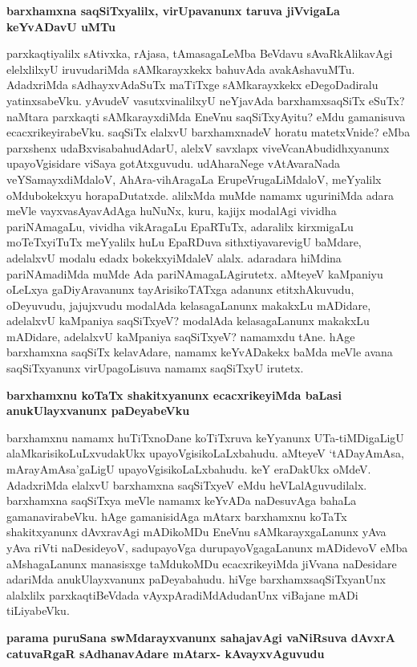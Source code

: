 {\medskip
\noindent
{\large\bf barxhamxna saqSiTxyalilx, virUpavanunx taruva jiVvigaLa keYvADavU uMTu}}\label{page192}
\medskip

\noindent
parxkaqtiyalilx sAtivxka, rAjasa, tAmasagaLeMba BeVdavu sAvaRkAlikavAgi elelx\-lilxyU iruvuda\-riMda sAMkarayxkekx bahuvAda avakAshavuMTu. AdadxriMda sAdhayxvAdaSuTx maTiTxge sAMkarayxkekx eDegoDadiralu yatinxsabeVku. yAvudeV vasutxvinalilxyU neYjavAda barxhamxsaqSiTx eSuTx? naMtara parxkaqti sAMkarayxdiMda EneVnu saqSiTxyAyitu? eMdu gamanisuva ecacxrikeyirabeVku. saqSiTx elalxvU barxhamxnadeV horatu matetxVnide? eMba parxshenx udaBxvisabahudAdarU, alelxV savxlapx viveVcanAbudidhxyanunx upayoVgisidare viSaya gotAtxguvudu. udAharaNege vAtAvaraNada veYSamayxdiMdaloV, AhAra-vihAragaLa Eru\-peVrugaLiMdaloV, meYyalilx oMdubokekxyu horapaDutatxde. alilxMda muMde namamx uguriniMda adara meVle vayxvasAyavAdAga huNuNx, kuru, kajijx modalAgi vividha pariNAmagaLu, vividha vikAragaLu EpaRTuTx, adaralilx kirxmigaLu moTeTxyiTuTx meYyalilx huLu EpaRDuva sithxtiyavarevigU baMdare, ade\-lalxvU modalu edadx bokekxyiMdaleV alalx. adaradara hiMdina pariNAmadiMda muMde Ada pariNAma\-gaLAgirutetx. aMteyeV kaMpaniyu oLeLxya gaDiyAravanunx tayArisikoTATxga adanunx etitxhAkuvudu, oDeyuvudu, jajujxvudu modalAda kelasagaLanunx makakxLu mADidare, adelalxvU kaMpaniya saqSiTxyeV? modalAda kelasagaLanunx makakxLu mADidare, adelalxvU kaMpaniya saqSiTxyeV? namamxdu tAne. hAge \-barxhamxna saqSiTx kelavAdare, namamx keYvADakekx baMda meVle avana saqSiTxyanunx virUpagoLisuva namamx saqSiTxyU irutetx.

{\bigskip
\noindent
{\large\bf barxhamxnu koTaTx shakitxyanunx ecacxrikeyiMda baLasi anukUlayxvanunx paDeyabeVku}}\label{page193}
\smallskip

\noindent
barxhamxnu namamx huTiTxnoDane koTiTxruva keYyanunx UTa-tiMDigaLigU alaM\-karisikoLuLxvudakUkx upa\-yoVgisikoLaLxbahudu. aMteyeV `tADayAmAsa, mArayAmAsa'gaLigU upayoVgisikoLaLxba\-hudu. keY eraDakUkx oMdeV. AdadxriMda elalxvU barxhamxna saqSiTxyeV eMdu heVLalAguvudilalx. barxhamxna saqSiTxya meVle namamx keYvADa naDesuvAga bahaLa gamanavirabeVku. hAge gamanisidAga mAtarx barxhamxnu koTaTx\- shakitxyanunx dAvxravAgi mADikoMDu EneVnu sAMkarayxgaLanunx yAva yAva riVti naDesideyoV, sadupayoVga durupayoVgagaLanunx mADidevoV eMba aMshagaLanunx manasisxge taMdukoMDu ecacxrike\-yiMda jiVvana naDesidare adariMda anukUlayxvanunx paDeyabahudu. hiVge barxhamxsaqSiTxyanUnx alalxlilx parxkaqtiBeVdada vAyxpAra\-diMdAdudanUnx viBajane mADi tiLiyabeVku.

{\bigskip
\noindent
{\large\bf parama puruSana swMdarayxvanunx sahajavAgi vaNiRsuva dAvxrA catuvaRgaR sAdhanavAdare mAtarx- kAvayxvAguvudu}}\label{page193}
\medskip

